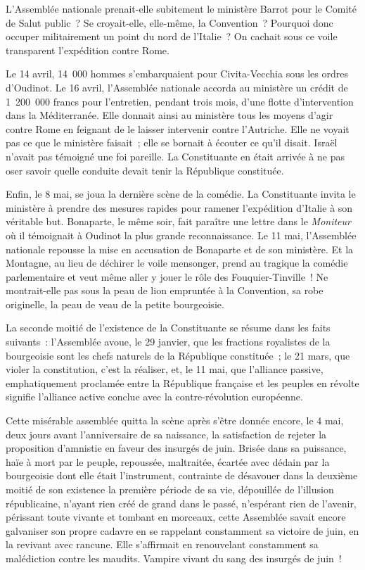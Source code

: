 \documentclass[french,twoside]{book} %
\begin{document}
L’Assemblée nationale prenait-elle subitement le ministère Barrot pour le Comité de Salut public ? Se croyait-elle, elle-même, la Convention ? Pourquoi donc occuper militairement un point du nord de l’Italie ? On cachait sous ce voile transparent l’expédition contre Rome.\par
Le 14 avril, 14 000 hommes s’embarquaient pour Civita-Vecchia sous les ordres d’Oudinot. Le 16 avril, l’Assemblée nationale accorda au ministère un crédit de 1 200 000 francs pour l’entretien, pendant trois mois, d’une flotte d’intervention dans la Méditerranée. Elle donnait ainsi au ministère tous les moyens d’agir contre Rome en feignant de le laisser intervenir contre l’Autriche. Elle ne voyait pas ce que le ministère faisait ; elle se bornait à écouter ce qu’il disait. Israël n’avait pas témoigné une foi pareille. La Constituante en était arrivée à ne pas oser savoir quelle conduite devait tenir la République constituée.\par
Enfin, le 8 mai, se joua la dernière scène de la comédie. La Constituante invita le ministère à prendre des mesures rapides pour ramener l’expédition d’Italie à son véritable but. Bonaparte, le même soir, fait paraître une lettre dans le \emph{Moniteur} où il témoignait à Oudinot la plus grande reconnaissance. Le 11 mai, l’Assemblée nationale repousse la mise en accusation de Bonaparte et de son ministère. Et la Montagne, au lieu de déchirer le voile mensonger, prend au tragique la comédie parlementaire et veut même aller y jouer le rôle des Fouquier-Tinville ! Ne montrait-elle pas sous la peau de lion empruntée à la Convention, sa robe originelle, la peau de veau de la petite bourgeoisie.\par
La seconde moitié de l’existence de la Constituante se résume dans les faits suivants : l’Assemblée avoue, le 29 janvier, que les fractions royalistes de la bourgeoisie sont les chefs naturels de la République constituée ; le 21 mars, que violer la constitution, c’est la réaliser, et, le 11 mai, que l’alliance passive, emphatiquement proclamée entre la République française et les peuples en révolte signifie l’alliance active conclue avec la contre-révolution européenne.\par
Cette misérable assemblée quitta la scène après s’être donnée encore, le 4 mai, deux jours avant l’anniversaire de sa naissance, la satisfaction de rejeter la proposition d’amnistie en faveur des insurgés de juin. Brisée dans sa puissance, haïe à mort par le peuple, repoussée, maltraitée, écartée avec dédain par la bourgeoisie dont elle était l’instrument, contrainte de désavouer dans la deuxième moitié de son existence la première période de sa vie, dépouillée de l’illusion républicaine, n’ayant rien créé de grand dans le passé, n’espérant rien de l’avenir, périssant toute vivante et tombant en morceaux, cette Assemblée savait encore galvaniser son propre cadavre en se rappelant constamment sa victoire de juin, en la revivant avec rancune. Elle s’affirmait en renouvelant constamment sa malédiction contre les maudits. Vampire vivant du sang des insurgés de juin !\par
\end{document}

